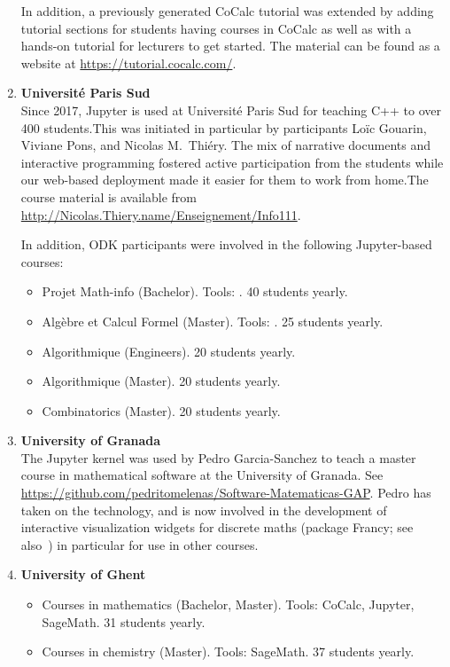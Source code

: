 \begin{enumerate}
  In addition, a previously generated CoCalc tutorial was extended by
  adding tutorial sections for students having courses in CoCalc as
  well as with a hands-on tutorial for lecturers to get started. The
  material can be found as a website at
  \url{https://tutorial.cocalc.com/}.

\item \textbf{Université Paris Sud}\\
  Since 2017, Jupyter is used at Université Paris Sud for teaching C++
  to over 400 students.This was initiated in particular by \ODK
  participants Loïc Gouarin, Viviane Pons, and Nicolas M.\ Thiéry. The
  mix of narrative documents and interactive programming fostered
  active participation from the students while our web-based
  deployment made it easier for them to work from home.The course
  material is available from
  \url{http://Nicolas.Thiery.name/Enseignement/Info111}.

  In addition, ODK participants were involved in the following
  Jupyter-based courses:
  \begin{itemize}
  \item Projet Math-info (Bachelor). Tools: \Sage. 40 students yearly.
  \item Algèbre et Calcul Formel (Master). Tools: \Sage. 25 students yearly.
  \item Algorithmique (Engineers). 20 students yearly.
  \item Algorithmique (Master). 20 students yearly.
  \item Combinatorics (Master). 20 students yearly.
  \end{itemize}

\item \textbf{University of Granada}\\
  The \GAP Jupyter kernel was used by Pedro Garcia-Sanchez to teach a
  master course in mathematical software at the University of Granada.
  See
  \url{https://github.com/pedritomelenas/Software-Matematicas-GAP}.
  Pedro has taken on the technology, and is now involved in the
  development of interactive visualization widgets for discrete maths
  (package Francy; see
  also~) in particular
  for use in other courses.

\item \textbf{University of Ghent}
  \begin{itemize}
  \item Courses in mathematics (Bachelor, Master). Tools: CoCalc,
    Jupyter, SageMath. 31 students yearly.
  \item Courses in chemistry (Master). Tools: SageMath. 37 students
    yearly.
  \end{itemize}


\end{enumerate}
